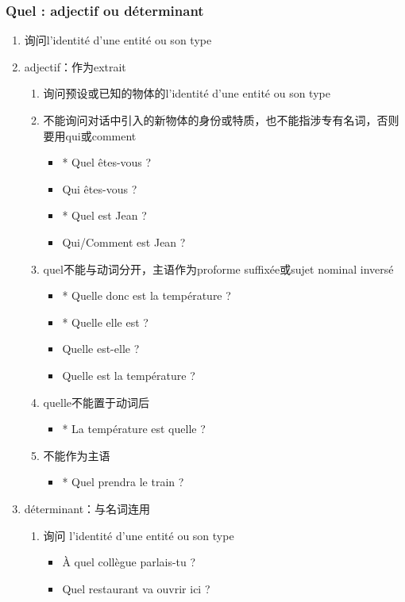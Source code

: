 \documentclass[UTF8]{report}
\begin{document}
\subsubsection{Quel : adjectif ou déterminant}
\begin{enumerate}
    \item 询问l’identité d’une entité ou son type
    \item adjectif：作为extrait
    \begin{enumerate}
        \item 询问预设或已知的物体的l’identité d’une entité ou son type
        \item 不能询问对话中引入的新物体的身份或特质，也不能指涉专有名词，否则要用qui或comment
            \begin{itemize}
                \item * Quel êtes-vous ?
                \item Qui êtes-vous ?
                \item * Quel est Jean ?
                \item Qui/Comment est Jean ?
            \end{itemize}
        \item quel不能与动词分开，主语作为proforme suffixée或sujet nominal inversé
        \begin{itemize}
            \item * Quelle donc est la température ?
            \item * Quelle elle est ?
            \item Quelle est-elle ?
            \item Quelle est la température ?
        \end{itemize}
        \item quelle不能置于动词后
        \begin{itemize}
            \item * La température est quelle ?
        \end{itemize}
        \item 不能作为主语
        \begin{itemize}
            \item * Quel prendra le train ?
        \end{itemize}
    \end{enumerate}
    \item déterminant：与名词连用
    \begin{enumerate}
        \item 询问 l’identité d’une entité ou son type
        \begin{itemize}
            \item À quel collègue parlais-tu ?
            \item Quel restaurant va ouvrir ici ?
        \end{itemize}
    \end{enumerate}
\end{enumerate}
\end{document}
